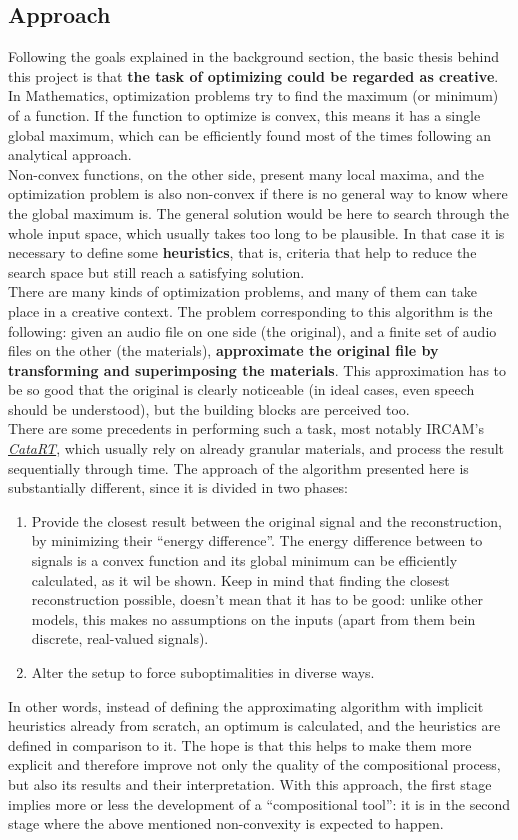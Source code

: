 \documentclass[11pt]{scrartcl} %
\begin{document}
\subsection*{Approach}
Following the goals explained in the background section, the basic thesis behind this project is that \textbf{the task of optimizing could be regarded as creative}. In Mathematics, optimization problems try to find the maximum (or minimum) of a function. If the function to optimize is convex, this means it has a single global maximum, which can be efficiently found most of the times following an analytical approach.\\
Non-convex functions, on the other side, present many local maxima, and the optimization problem is also non-convex if there is no general way to know where the global maximum is. The general solution would be here to search through the whole input space, which usually takes too long to be plausible. In that case it is necessary to define some \textbf{heuristics}, that is, criteria that help to reduce the search space but still reach a satisfying solution.\\[7pt]
There are many kinds of optimization problems, and many of them can take place in a creative context. The problem corresponding to this algorithm is the following: given an audio file on one side (the original), and a finite set of audio files on the other (the materials), \textbf{approximate the original file by transforming and superimposing the materials}. This approximation has to be so good that the original is clearly noticeable (in ideal cases, even speech should be understood), but the building blocks are perceived too.\\[7pt]
There are some precedents in performing such a task, most notably IRCAM's \href{http://imtr.ircam.fr/imtr/CataRT}{{\it CataRT}}, which usually rely on already granular materials, and process the result sequentially through time. The approach of the algorithm presented here is substantially different, since it is divided in two phases:
\begin{enumerate}
\item Provide the closest result between the original signal and the reconstruction, by minimizing their ``energy difference''. The energy difference between to signals is a convex function and its global minimum can be efficiently calculated, as it wil be shown. Keep in mind that finding the closest reconstruction possible, doesn't mean that it has to be good: unlike other models, this makes no assumptions on the inputs (apart from them bein discrete, real-valued signals).
\item Alter the setup to force suboptimalities in diverse ways.
\end{enumerate}
In other words, instead of defining the approximating algorithm with implicit heuristics already from scratch, an optimum is calculated, and the heuristics are defined in comparison to it. The hope is that this helps to make them more explicit and therefore improve not only the quality of the compositional process, but also its results and their interpretation. With this approach, the first stage implies more or less the development of a ``compositional tool'': it is in the second stage where the above mentioned non-convexity is expected to happen.
\end{document}
